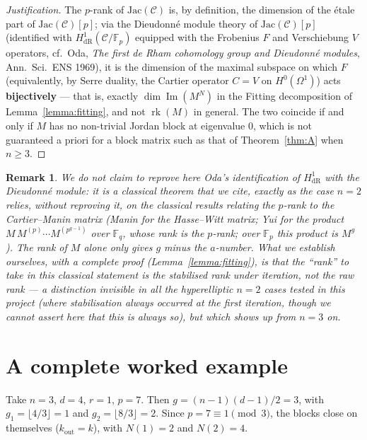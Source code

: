 \documentclass[11pt,a4paper]{article}
\newtheorem{remark}[theorem]{Remark}
\newcommand{\F}{\mathbb{F}}
\DeclareMathOperator{\rg}{rk}
\begin{document}
\begin{proof}[Justification]
The $p$-rank of $\mathrm{Jac}(\mathcal{C})$ is, by definition, the dimension of
the \'etale part of $\mathrm{Jac}(\mathcal{C})[p]$; via the Dieudonn\'e module
theory of $\mathrm{Jac}(\mathcal{C})[p]$ (identified with
$H^1_{\mathrm{dR}}(\mathcal{C}/\F_p)$ equipped with the Frobenius $F$ and
Verschiebung $V$ operators, cf.\ Oda, \emph{The first de Rham cohomology group
and Dieudonn\'e modules}, Ann.\ Sci.\ ENS 1969), it is the dimension of the
maximal subspace on which $F$ (equivalently, by Serre duality, the Cartier
operator $C=V$ on $H^0(\Omega^1)$) acts \textbf{bijectively} --- that is, exactly
$\dim\operatorname{Im}(M^N)$ in the Fitting decomposition of
Lemma~\ref{lemma:fitting}, and not $\rg(M)$ in general. The two coincide if and
only if $M$ has no non-trivial Jordan block at eigenvalue $0$, which is not
guaranteed a priori for a block matrix such as that of Theorem~\ref{thm:A} when
$n\ge3$.
\end{proof}

\begin{remark}
We do not claim to reprove here Oda's identification of $H^1_{\mathrm{dR}}$ with
the Dieudonn\'e module: it is a classical theorem that we cite, exactly as the
case $n=2$ relies, without reproving it, on the classical results relating the
$p$-rank to the Cartier--Manin matrix (Manin for the Hasse--Witt matrix; Yui for
the product $M\,M^{(p)}\cdots M^{(p^{g-1})}$ over $\F_q$, whose rank is the $p$-rank;
over $\F_p$ this product is $M^g$). The rank of $M$ alone only gives $g$ minus the
$a$-number. What we establish
ourselves, with a complete proof (Lemma~\ref{lemma:fitting}), is that the
\emph{``rank''} to take in this classical statement is the stabilised rank under
iteration, not the raw rank --- a distinction invisible in all the hyperelliptic
$n=2$ cases tested in this project (where stabilisation always occurred at the
first iteration, though we cannot assert here that this is always so), but which
shows up from $n=3$ on.
\end{remark}

\section{A complete worked example}

Take $n=3$, $d=4$, $r=1$, $p=7$. Then $g=(n-1)(d-1)/2=3$, with
$g_1=\lfloor4/3\rfloor=1$ and $g_2=\lfloor8/3\rfloor=2$. Since
$p=7\equiv1\pmod3$, the blocks close on themselves ($k_{\mathrm{out}}=k$), with
$N(1)=2$ and $N(2)=4$.
\end{document}
